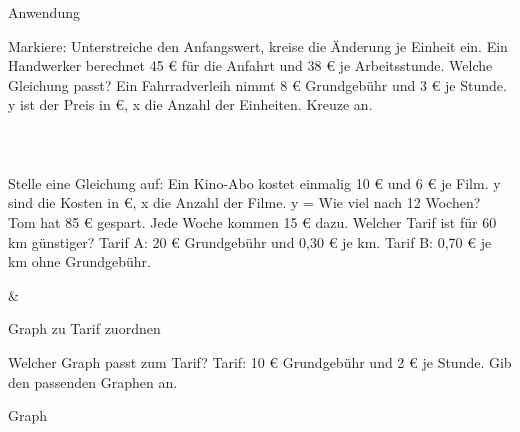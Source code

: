 \setcounter{aufgabe}{27}

\begin{aufgabe}{Anwendung}
\begin{teile}
\teil Markiere: Unterstreiche den Anfangswert, kreise die Änderung je Einheit ein. Ein Handwerker berechnet 45 € für die Anfahrt und 38 € je Arbeitsstunde.
\teil Welche Gleichung passt? Ein Fahrradverleih nimmt 8 € Grundgebühr und 3 € je Stunde. y ist der Preis in €, x die Anzahl der Einheiten. Kreuze an. \\  \\  \\  \\ 
\teil Stelle eine Gleichung auf: Ein Kino-Abo kostet einmalig 10 € und 6 € je Film. y sind die Kosten in €, x die Anzahl der Filme. y = \leerfeld
\teil Wie viel nach 12 Wochen? Tom hat 85 € gespart. Jede Woche kommen 15 € dazu. \leerfeld[€]
\teil Welcher Tarif ist für 60 km günstiger? Tarif A: 20 € Grundgebühr und 0{,}30 € je km. Tarif B: 0{,}70 € je km ohne Grundgebühr.
\end{teile}
\begin{gleichungsraster}[2]
 & \\
\end{gleichungsraster}
\end{aufgabe}

\begin{aufgabe}{Graph zu Tarif zuordnen}
\begin{teile}
\teil Welcher Graph passt zum Tarif? Tarif: 10 € Grundgebühr und 2 € je Stunde. Gib den passenden Graphen an.

\begin{ksys}[xmin=0,xmax=8,ymin=0,ymax=40,xstep=1,ystep=5,ablesen]    \end{ksys}
Graph \leerfeld
\end{teile}
\end{aufgabe}

